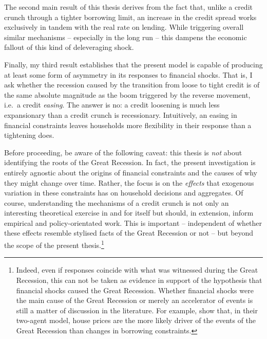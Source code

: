 \documentclass[a4paper,12pt]{article} %
\numberwithin{equation}{section} %
\numberwithin{figure}{section}
\numberwithin{table}{section}
\begin{document}
The second main result of this thesis derives from the fact that, unlike a credit crunch through a tighter borrowing limit, an increase in the credit spread works exclusively in tandem with the real rate on lending. While triggering overall similar mechanisms -- especially in the long run -- this dampens the economic fallout of this kind of deleveraging shock.

Finally, my third result establishes that the present model is capable of producing at least some form of asymmetry in its responses to financial shocks. That is, I ask whether the recession caused by the transition from loose to tight credit is of the same absolute magnitude as the boom triggered by the reverse movement, i.e.~a credit \textit{easing}. The answer is no: a credit loosening is much less expansionary than a credit crunch is recessionary. Intuitively, an easing in financial constraints leaves households more flexibility in their response than a tightening does.

Before proceeding, be aware of the following caveat: this thesis is \textit{not} about identifying the roots of the Great Recession. In fact, the present investigation is entirely agnostic about the origins of financial constraints and the causes of why they might change over time. Rather, the focus is on the \textit{effects} that exogenous variation in these constraints has on household decisions and aggregates. Of course, understanding the mechanisms of a credit crunch is not only an interesting theoretical exercise in and for itself but should, in extension, inform empirical and policy-orientated work. This is important -- independent of whether these effects resemble stylised facts of the Great Recession or not -- but beyond the scope of the present thesis.\footnote{Indeed, even if responses coincide with what was witnessed during the Great Recession, this can not be taken as evidence in support of the hypothesis that financial shocks caused the Great Recession. Whether financial shocks were the main cause of the Great Recession or merely an accelerator of events is still a matter of discussion in the literature. For example, \textcite{justiniano2015} show that, in their two-agent model, house prices are the more likely driver of the events of the Great Recession than changes in borrowing constraints.}

\end{document}
